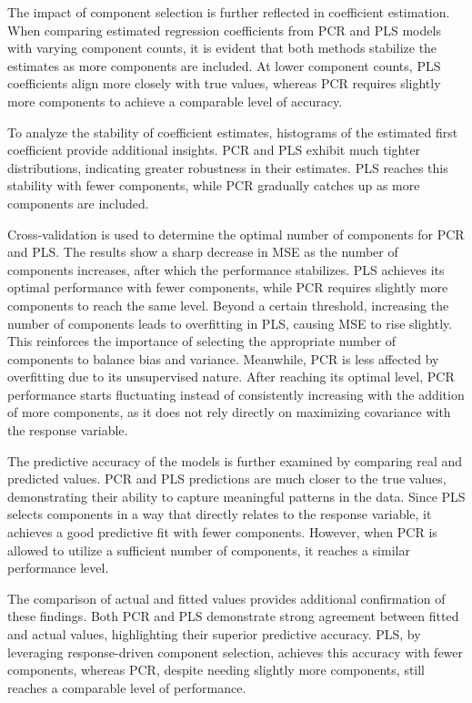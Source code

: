 \documentclass[11pt,twoside,a4paper]{article}
\begin{document}
The impact of component selection is further reflected in coefficient estimation. When comparing estimated regression coefficients from PCR and PLS models with varying component counts, it is evident that both methods stabilize the estimates as more components are included. At lower component counts, PLS coefficients align more closely with true values, whereas PCR requires slightly more components to achieve a comparable level of accuracy.

To analyze the stability of coefficient estimates, histograms of the estimated first coefficient provide additional insights. PCR and PLS exhibit much tighter distributions, indicating greater robustness in their estimates. PLS reaches this stability with fewer components, while PCR gradually catches up as more components are included.

Cross-validation is used to determine the optimal number of components for PCR and PLS. The results show a sharp decrease in MSE as the number of components increases, after which the performance stabilizes. PLS achieves its optimal performance with fewer components, while PCR requires slightly more components to reach the same level. Beyond a certain threshold, increasing the number of components leads to overfitting in PLS, causing MSE to rise slightly. This reinforces the importance of selecting the appropriate number of components to balance bias and variance. Meanwhile, PCR is less affected by overfitting due to its unsupervised nature. After reaching its optimal level, PCR performance starts fluctuating instead of consistently increasing with the addition of more components, as it does not rely directly on maximizing covariance with the response variable.

The predictive accuracy of the models is further examined by comparing real and predicted values. PCR and PLS predictions are much closer to the true values, demonstrating their ability to capture meaningful patterns in the data. Since PLS selects components in a way that directly relates to the response variable, it achieves a good predictive fit with fewer components. However, when PCR is allowed to utilize a sufficient number of components, it reaches a similar performance level.

The comparison of actual and fitted values provides additional confirmation of these findings. Both PCR and PLS demonstrate strong agreement between fitted and actual values, highlighting their superior predictive accuracy. PLS, by leveraging response-driven component selection, achieves this accuracy with fewer components, whereas PCR, despite needing slightly more components, still reaches a comparable level of performance.
\end{document}

